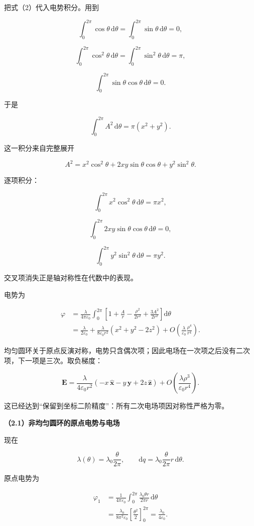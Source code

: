 \documentclass[12pt,a4paper,UTF8]{ctexart}
\begin{document}
把式（2）代入电势积分。用到

\[\int_0^{2\pi}\cos\theta\,\mathrm d\theta
=\int_0^{2\pi}\sin\theta\,\mathrm d\theta=0,\]

\[\int_0^{2\pi}\cos^2\theta\,\mathrm d\theta
=\int_0^{2\pi}\sin^2\theta\,\mathrm d\theta=\pi,\]

\[\int_0^{2\pi}\sin\theta\cos\theta\,\mathrm d\theta=0.\]

于是

\[\int_0^{2\pi}A^2\,\mathrm d\theta
=\pi(x^2+y^2).\]

这一积分来自完整展开

\[A^2=x^2\cos^2\theta
+2xy\sin\theta\cos\theta
+y^2\sin^2\theta.\]

逐项积分：

\[\int_0^{2\pi}x^2\cos^2\theta\,\mathrm d\theta=\pi x^2,\]

\[\int_0^{2\pi}2xy\sin\theta\cos\theta\,\mathrm d\theta=0,\]

\[\int_0^{2\pi}y^2\sin^2\theta\,\mathrm d\theta=\pi y^2.\]

交叉项消失正是轴对称性在代数中的表现。

电势为

\[\begin{aligned}
\varphi
&=\frac{\lambda}{4\pi\varepsilon_0}
\int_0^{2\pi}\left[1+\frac{A}{r}
-\frac{\rho^2}{2r^2}+\frac{3A^2}{2r^2}\right]\mathrm d\theta\\
&=\frac{\lambda}{2\varepsilon_0}
+\frac{\lambda}{8\varepsilon_0r^2}(x^2+y^2-2z^2)
+O\!\left(\frac{\lambda}{\varepsilon_0}\frac{\rho^4}{r^4}\right).
\end{aligned} \tag{4}\]

均匀圆环关于原点反演对称，电势只含偶次项；因此电场在一次项之后没有二次项，下一项是三次。取负梯度：

\[\boxed{
\boldsymbol E
=\frac{\lambda}{4\varepsilon_0r^2}
\left(-x\,\hat{\boldsymbol x}-y\,\hat{\boldsymbol y}
+2z\,\hat{\boldsymbol z}\right)+O\!\left(\frac{\lambda\rho^3}{\varepsilon_0r^4}\right)
}. \tag{5}\]

这已经达到``保留到坐标二阶精度''：所有二次电场项因对称性严格为零。

\textbf{（2.1）非均匀圆环的原点电势与电场}

现在

\[\lambda(\theta)=\lambda_0\frac{\theta}{2\pi},\qquad
\mathrm dq=\lambda_0\frac{\theta}{2\pi}r\,\mathrm d\theta.\]

原点电势为

\[\begin{aligned}
\varphi_1
&=\frac1{4\pi\varepsilon_0}
\int_0^{2\pi}\frac{\lambda_0\theta r}{2\pi r}\,\mathrm d\theta\\
&=\frac{\lambda_0}{8\pi^2\varepsilon_0}
\left[\frac{\theta^2}{2}\right]_0^{2\pi}
=\frac{\lambda_0}{4\varepsilon_0}. 
\end{aligned}\]
\end{document}
